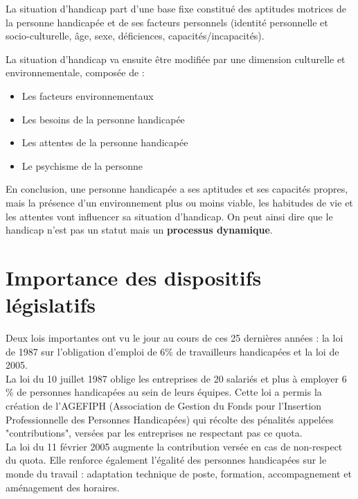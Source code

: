 La situation d'handicap part d'une base fixe constitué des aptitudes motrices de la personne handicapée et de ses facteurs personnels (identité personnelle et socio-culturelle, âge, sexe, déficiences, capacités/incapacités). 

La situation d'handicap va ensuite être modifiée par une dimension culturelle et environnementale, composée de :
\begin{itemize}
\item Les facteurs environnementaux
\item Les besoins de la personne handicapée
\item Les attentes de la personne handicapée
\item Le psychisme de la personne\\
\end{itemize}


En conclusion, une personne handicapée a ses aptitudes et ses capacités propres, mais la présence d'un environnement plus ou moins viable, les habitudes de vie et les attentes vont influencer sa situation d'handicap.
On peut ainsi dire que le handicap n'est pas un statut mais un \textbf{processus dynamique}. 



\section{Importance des dispositifs législatifs}
Deux lois importantes ont vu le jour au cours de ces 25 dernières années : la loi de 1987 sur l'obligation d'emploi de 6\% de travailleurs handicapées et la loi de 2005.\\

La loi du 10 juillet 1987 oblige les entreprises de 20 salariés et plus à employer 6 \% de personnes handicapées au sein de leurs équipes. Cette loi a permis la création de l'AGEFIPH (Association de Gestion du Fonds pour l'Insertion Professionnelle des Personnes Handicapées) qui récolte des pénalités appelées "contributions", versées par les entreprises ne respectant pas ce quota.\\

La loi du 11 février 2005 augmente la contribution versée en cas de non-respect du quota. Elle renforce également l'égalité des personnes handicapées sur le monde du travail : adaptation technique de poste, formation, accompagnement et aménagement des horaires.\\

